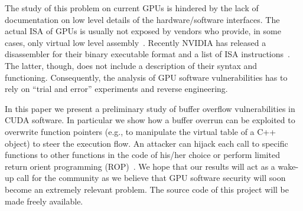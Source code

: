 \documentclass[11pt]{llncs}
\begin{document}
The study of this problem on current GPUs is hindered by the lack of documentation on low level details of the hardware/software interfaces.
The actual ISA of GPUs is usually not exposed by vendors who provide, in some cases, only virtual low level assembly~\cite{PTX}.
Recently NVIDIA has released a disassembler for their binary executable format and a list of ISA instructions~\cite{cudabin}.
The latter, though, does not include a description of their syntax and functioning.
Consequently, the analysis of GPU software vulnerabilities has to rely on ``trial and error'' experiments and reverse engineering.

In this paper we present a preliminary study of buffer overflow vulnerabilities in CUDA software.
In particular we show how a buffer overrun can be exploited to overwrite function pointers (e.g., to manipulate the virtual table of a C++ object) to steer the execution flow.
An attacker can hijack each call to specific functions to other functions in the code of his/her choice or perform limited return orient programming (ROP)~\cite{rop}.
We hope that our results will act as a wake-up call for the community as we believe that GPU software security will soon become an extremely relevant problem.
The source code of this project will be made freely available.
\end{document}
